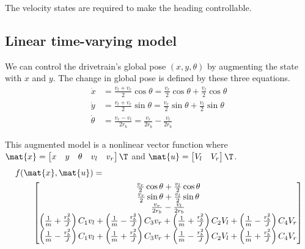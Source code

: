The velocity states are required to make the heading controllable.

\subsection{Linear time-varying model}

We can control the drivetrain's global pose $(x, y, \theta)$ by augmenting the
state with $x$ and $y$. The change in global pose is defined by these three
equations.
\begin{align*}
  \dot{x} &= \frac{v_l + v_r}{2}\cos\theta = \frac{v_r}{2}\cos\theta +
    \frac{v_l}{2}\cos\theta \\
  \dot{y} &= \frac{v_l + v_r}{2}\sin\theta = \frac{v_r}{2}\sin\theta +
    \frac{v_l}{2}\sin\theta \\
  \dot{\theta} &= \frac{v_r - v_l}{2r_b} = \frac{v_r}{2r_b} - \frac{v_l}{2r_b}
\end{align*}

This augmented model is a nonlinear vector function where
$\mat{x} = \begin{bmatrix} x & y & \theta & v_l & v_r \end{bmatrix}\T$ and
$\mat{u} = \begin{bmatrix} V_l & V_r \end{bmatrix}\T$.
\begin{align}
  &f(\mat{x}, \mat{u}) = \nonumber \\
  &\qquad \begin{bmatrix}
    \frac{v_r}{2}\cos\theta + \frac{v_l}{2}\cos\theta \\
    \frac{v_r}{2}\sin\theta + \frac{v_l}{2}\sin\theta \\
    \frac{v_r}{2r_b} - \frac{v_l}{2r_b} \\
    \left(\frac{1}{m} + \frac{r_b^2}{J}\right) C_1 v_l +
      \left(\frac{1}{m} - \frac{r_b^2}{J}\right) C_3 v_r +
      \left(\frac{1}{m} + \frac{r_b^2}{J}\right) C_2 V_l +
      \left(\frac{1}{m} - \frac{r_b^2}{J}\right) C_4 V_r \\
    \left(\frac{1}{m} - \frac{r_b^2}{J}\right) C_1 v_l +
      \left(\frac{1}{m} + \frac{r_b^2}{J}\right) C_3 v_r +
      \left(\frac{1}{m} - \frac{r_b^2}{J}\right) C_2 V_l +
      \left(\frac{1}{m} + \frac{r_b^2}{J}\right) C_4 V_r
  \end{bmatrix}
  \label{eq:ltv_diff_drive_f}
\end{align}

